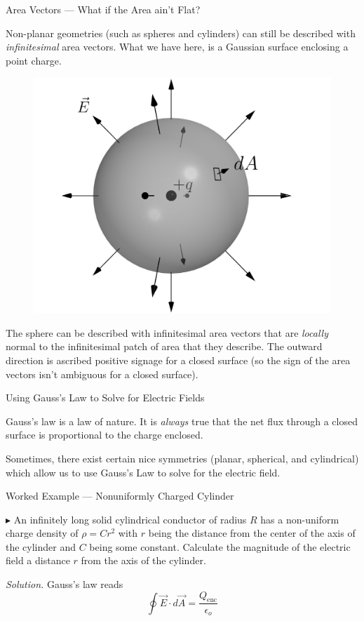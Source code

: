 \documentclass{beamer}
\begin{document}
\begin{frame}{Area Vectors --- What if the Area ain't Flat?}

Non-planar geometries (such as spheres and cylinders) can still be described with \emph{infinitesimal} area vectors. What we have here, is a Gaussian surface enclosing a point charge.

\begin{figure}[H]
\centering
\includegraphics[height=0.36\textwidth]{figures/gaussian_surface.png}
\end{figure}

The sphere can be described with infinitesimal area vectors that are \emph{locally} normal to the infinitesimal patch of area that they describe. The outward direction is ascribed positive signage for a closed surface (so the sign of the area vectors isn't ambiguous for a closed surface).

\end{frame}

\begin{frame}{Using Gauss's Law to Solve for Electric Fields}

Gauss's law is a law of nature. It is \emph{always} true that the net flux through a closed surface is proportional to the charge enclosed.

\vfill

Sometimes, there exist certain nice symmetries (planar, spherical, and cylindrical) which allow us to use Gauss's Law to solve for the electric field.

\end{frame}

\begin{frame}{Worked Example --- Nonuniformly Charged Cylinder}

$\blacktriangleright$ An infinitely long solid cylindrical conductor of radius $R$ has a non-uniform charge density of $\rho = Cr^2$ with $r$ being the distance from the center of the axis of the cylinder and $C$ being some constant. Calculate the magnitude of the electric field a distance $r$ from the axis of the cylinder.

\vfill

\textit{Solution.} Gauss's law reads
\begin{equation*}
    \oint \vec{E} \cdot d\vec{A} = \frac{Q_{\text{enc}}}{\epsilon_o}
\end{equation*}

\end{frame}
\end{document}
